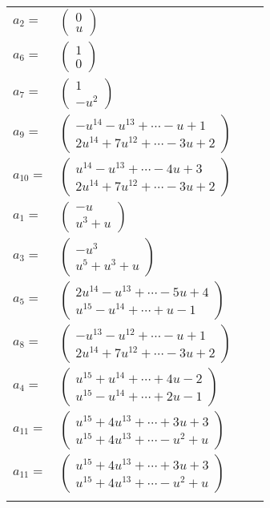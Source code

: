 \documentclass[1p]{elsarticle_modified}
\theoremstyle{definition}
\begin{document}
\begin{tabular}{m{7pt} m{180pt} m{7pt} m{180pt} }
\flushright $a_{2}=$&$\begin{pmatrix}0\\u\end{pmatrix}$ \\
\flushright $a_{6}=$&$\begin{pmatrix}1\\0\end{pmatrix}$ \\
\flushright $a_{7}=$&$\begin{pmatrix}1\\- u^2\end{pmatrix}$ \\
\flushright $a_{9}=$&$\begin{pmatrix}- u^{14}- u^{13}+\cdots- u+1\\2 u^{14}+7 u^{12}+\cdots-3 u+2\end{pmatrix}$ \\
\flushright $a_{10}=$&$\begin{pmatrix}u^{14}- u^{13}+\cdots-4 u+3\\2 u^{14}+7 u^{12}+\cdots-3 u+2\end{pmatrix}$ \\
\flushright $a_{1}=$&$\begin{pmatrix}- u\\u^3+u\end{pmatrix}$ \\
\flushright $a_{3}=$&$\begin{pmatrix}- u^3\\u^5+u^3+u\end{pmatrix}$ \\
\flushright $a_{5}=$&$\begin{pmatrix}2 u^{14}- u^{13}+\cdots-5 u+4\\u^{15}- u^{14}+\cdots+u-1\end{pmatrix}$ \\
\flushright $a_{8}=$&$\begin{pmatrix}- u^{13}- u^{12}+\cdots- u+1\\2 u^{14}+7 u^{12}+\cdots-3 u+2\end{pmatrix}$ \\
\flushright $a_{4}=$&$\begin{pmatrix}u^{15}+u^{14}+\cdots+4 u-2\\u^{15}- u^{14}+\cdots+2 u-1\end{pmatrix}$ \\
\flushright $a_{11}=$&$\begin{pmatrix}u^{15}+4 u^{13}+\cdots+3 u+3\\u^{15}+4 u^{13}+\cdots- u^2+u\end{pmatrix}$\\ \flushright $a_{11}=$&$\begin{pmatrix}u^{15}+4 u^{13}+\cdots+3 u+3\\u^{15}+4 u^{13}+\cdots- u^2+u\end{pmatrix}$\\&\end{tabular}
\end{document}
